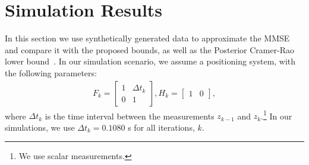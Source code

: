 \documentclass[10pt,twocolumn,twoside]{IEEEtran}
\newcommand{\corcol}[1]{\textcolor{CorCol}{#1}}
\begin{document}
\section{Simulation Results}
\label{sec:SimulationResults}
In this section we use synthetically generated data to approximate the MMSE and compare it with the proposed bounds\corcol{, as well as the Posterior Cramer-Rao lower bound~\cite{tichavsky_posterior_1998}}. In our simulation scenario, we assume a positioning system, with the following parameters:
\begin{align}
F_k =  \begin{bmatrix}
1 & \Delta t_{k} \\
0 & 1
\end{bmatrix},
H_k = \begin{bmatrix}
1 & 0
\end{bmatrix},
\end{align}
where \(\Delta t_{k}\) is the time interval between the measurements \(z_{k-1}\) and \(z_k\).\footnote{We use scalar measurements.} In our simulations, we use \(\Delta t_k=0.1080\) s for all iterations, \(k\).
\end{document}
